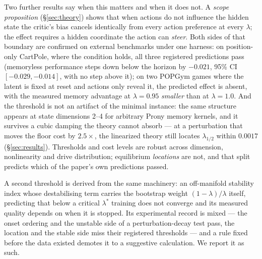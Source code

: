 Two further results say when this matters and when it does not. A
\emph{scope proposition} (\S\ref{sec:theory}) shows that when actions do not
influence the hidden state the critic's bias cancels identically from every
action preference at every $\lambda$; the effect requires a hidden coordinate
the action can \emph{steer}. Both sides of that boundary are confirmed on
external benchmarks under one harness: on position-only CartPole, where the
condition holds, all three registered predictions pass (memoryless
performance steps down below the horizon by $-0.021$, 95\% CI
$[-0.029,-0.014]$, with no step above it); on two POPGym games where the
latent is fixed at reset and actions only reveal it, the predicted effect is
absent, with the measured memory advantage at $\lambda=0.95$ \emph{smaller}
than at $\lambda=1.0$. And the threshold is not an artifact of the minimal
instance: the same structure appears at state dimensions 2--4 for arbitrary
Prony memory kernels, and it survives a cubic damping the theory cannot
absorb --- at a perturbation that moves the floor cost by $2.5\times$, the
linearized theory still locates $\lambda_{1/2}$ within $0.0017$
(\S\ref{sec:results}). Thresholds and cost levels are robust across
dimension, nonlinearity and drive distribution; equilibrium \emph{locations}
are not, and that split predicts which of the paper's own predictions passed.

A second threshold is derived from the same machinery: an off-manifold
stability index whose destabilising term carries the bootstrap weight
$(1-\lambda)/\lambda$ itself, predicting that below a critical $\lambda^\ast$
training does not converge and its measured quality depends on when it is
stopped. Its experimental record is mixed --- the onset ordering and the
unstable side of a perturbation-decay test pass, the location and the stable
side miss their registered thresholds --- and a rule fixed before the data
existed demotes it to a suggestive calculation. We report it as such.

